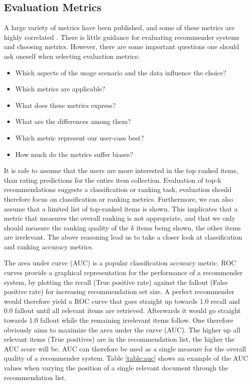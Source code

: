 

\subsection{Evaluation Metrics}



A large variety of metrics have been published, and some of these metrics are highly correlated \cite{Herlocker2004}.
There is little guidance for evaluating recommender systems and choosing metrics. However, there are
some important questions one should ask oneself when selecting evaluation metrics:

\begin{itemize}
	\item Which aspects of the usage scenario and the data influence the choice?
	\item Which metrics are applicable?
	\item What does these metrics express?
	\item What are the differences among them?
	\item Which metric represent our user-case best?
	\item How much do the metrics suffer biases?
\end{itemize}

It is safe to assume that the users are more interested in the top ranked items, than rating
predictions for the entire item collection. Evaluation of top-k recommendations suggests a
classification or ranking task, evaluation should therefore focus on classification or ranking metrics.
Furthermore, we can also assume that a limited list of top-ranked items is shown. This implicates
that a metric that measures the overall ranking is not appropriate, and that we only should measure
the ranking quality of the $k$ items being shown, the other items are irrelevant. The above reasoning
lead us to take a closer look at classification and ranking accuracy metrics.


The area under curve (AUC) is a popular classification accuracy metric. ROC curves provide a graphical
representation for the performance of a recommender system, by plotting the recall (True positive rate)
against the fallout (False positive rate) for increasing recommendation set size. A perfect recommender
would therefore yield a ROC curve that goes straight up towards 1.0 recall and 0.0 fallout until all
relevant items are retrieved. Afterwards it would go straight towards 1.0 fallout while the remaining
irrelevant items follow. One therefore obviously aims to maximize the area under the curve (AUC). The higher
up all relevant items (True positives) are in the recommendation list, the higher the AUC score will be.
AUC can therefore be used as a single measure for the overall quality of a recommender system. Table \ref{table:auc}
shows an example of the AUC values when varying the position of a single relevant document through the
recommendation list.

